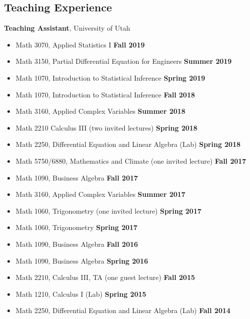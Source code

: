 \documentclass[margin,line]{res}
\begin{document}
\begin{resume}
\section{\sc Teaching Experience}
{\bf Teaching Assistant}, University of Utah
\vspace*{.05in}
\begin{itemize}
\item[ ] Math 3070, Applied Statistics I \hfill {\bf Fall 2019}
\item[ ] Math 3150, Partial Differential Equation for Engineers \hfill {\bf Summer 2019}
\item[ ] Math 1070, Introduction to Statistical Inference \hfill {\bf Spring 2019}
\item[ ] Math 1070, Introduction to Statistical Inference \hfill {\bf Fall 2018}
\item[ ] Math 3160, Applied Complex Variables \hfill {\bf Summer 2018}
\item[ ] Math 2210 Calculus III (two invited lectures) \hfill {\bf Spring 2018}
\item[ ] Math 2250, Differential Equation and Linear Algebra (Lab) \hfill {\bf Spring 2018}
\item[ ] Math 5750/6880, Mathematics and Climate (one invited lecture) \hfill {\bf Fall 2017}
\item[ ] Math 1090, Business Algebra \hfill {\bf Fall 2017}
\item[ ] Math 3160, Applied Complex Variables \hfill {\bf Summer 2017}
\item[ ] Math 1060, Trigonometry (one invited lecture) \hfill {\bf Spring 2017}
\item[ ] Math 1060, Trigonometry \hfill {\bf Spring 2017}
\item[ ] Math 1090, Business Algebra \hfill {\bf Fall 2016}
\item[ ] Math 1090, Business Algebra \hfill {\bf Spring 2016}
\item[ ] Math 2210, Calculus III, TA (one guest lecture) \hfill {\bf Fall 2015}
\item[ ] Math 1210, Calculus I (Lab) \hfill {\bf Spring 2015}
\item[ ] Math 2250, Differential Equation and Linear Algebra (Lab) \hfill {\bf Fall 2014}
\end{itemize}

\end{resume}
\end{document}

